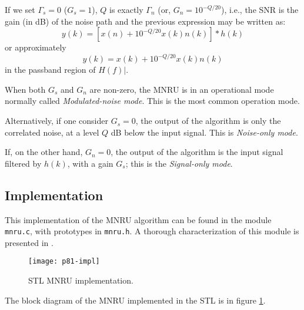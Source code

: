 If we set $\Gamma_s=0$ ($G_s=1$), $Q$ is exactly $\Gamma_n$ (or, $G_n=10^{-Q/20}$), i.e., the SNR is the gain (in dB) of the noise
path and the previous expression may be written as:
\[
y(k)=[x(n)+10^{-Q/20} x(k) n(k)] \ast h(k)
\]
or approximately
\[
y(k)=x(k)+10^{-Q/20} x(k) n(k)
\]
in the passband region of $H(f)|$.

When both $G_s$ and $G_n$ are non-zero, the MNRU is in an operational mode normally called {\em Modulated-noise mode}.
This is the most common operation mode.

Alternatively, if one consider $G_s=0$, the output of the algorithm is only the correlated noise, at a level $Q$ dB below the input signal.
This is {\em Noise-only mode}.

If, on the other hand, $G_n=0$, the output of the algorithm is the input signal filtered by $h(k)$, with a gain $G_s$;
this is the {\em Signal-only mode}.

\subsection{Implementation}

This implementation of the MNRU algorithm can be found in the module {\tt mnru.c}, with prototypes in {\tt mnru.h}.
A thorough characterization of this module is presented in \cite{Duo-MNRU}.

\begin{figure}[ht]
  \begin{center}
    \texttt{[image: p81-impl]}
  \end{center}
   \caption{STL MNRU implementation.\label{STL96-MNRU}}
\end{figure}

The block diagram of the MNRU implemented in the STL is in figure \ref{STL96-MNRU}.

